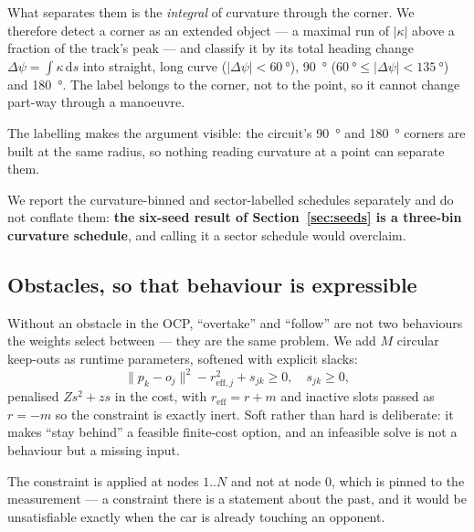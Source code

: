 \documentclass[letterpaper, 10 pt, conference]{ieeeconf}
\begin{document}
What separates them is the \emph{integral} of curvature through the corner. We
therefore detect a corner as an extended object --- a maximal run of $|\kappa|$
above a fraction of the track's peak --- and classify it by its total heading
change $\Delta\psi = \int \kappa\,\mathrm{d}s$ into straight, long curve
($|\Delta\psi| < \SI{60}{\degree}$), \SI{90}{\degree}
($\SI{60}{\degree} \le |\Delta\psi| < \SI{135}{\degree}$) and
\SI{180}{\degree}. The label belongs to the corner, not to the point, so it
cannot change part-way through a manoeuvre.

The labelling makes
the argument visible: the circuit's \SI{90}{\degree} and \SI{180}{\degree}
corners are built at the same radius, so nothing reading curvature at a point
can separate them.

We report the curvature-binned and sector-labelled schedules separately and do
not conflate them: \textbf{the six-seed result of Section~\ref{sec:seeds} is a
three-bin curvature schedule}, and calling it a sector schedule would overclaim.

\subsection{Obstacles, so that behaviour is expressible}
Without an obstacle in the OCP, ``overtake'' and ``follow'' are not two
behaviours the weights select between --- they are the same problem. We add
$M$ circular keep-outs as runtime parameters, softened with explicit slacks:
\begin{equation}
  \lVert p_k - o_j \rVert^2 - r_{\text{eff},j}^2 + s_{jk} \ge 0,
  \quad s_{jk}\ge 0,
  \label{eq:keepout}
\end{equation}
penalised $Z s^2 + z s$ in the cost, with $r_{\text{eff}} = r + m$ and inactive
slots passed as $r = -m$ so the constraint is exactly inert. Soft rather than
hard is deliberate: it makes ``stay behind'' a feasible finite-cost option, and
an infeasible solve is not a behaviour but a missing input.

The constraint is applied at nodes $1..N$ and not at node $0$, which is pinned
to the measurement --- a constraint there is a statement about the past, and it
would be unsatisfiable exactly when the car is already touching an opponent.
\end{document}
